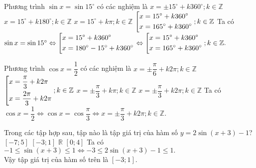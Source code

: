 \begin{ex}%
	Phương trình $\sin x =\sin 15^{\circ}$ có các nghiệm là
	\choice
	{$x=\pm 15^{\circ}+k360^{\circ}; k \in \mathbb{Z}$}
	{$x=15^{\circ}+k180^{\circ}; k \in \mathbb{Z}$}
	{$x=15^{\circ}+k\pi; k \in \mathbb{Z}$}
	{\True $\left[\begin{aligned}&x=15^{\circ}+k360^{\circ}\\&x=165^{\circ}+k360^{\circ}\\\end{aligned}\right.; k \in \mathbb{Z}$}
	\loigiai
	{Ta có $\sin x =\sin 15^{\circ}  \Leftrightarrow \left[\begin{aligned}&x=15^{\circ}+k360^{\circ}\\&x=180^{\circ} - 15^{\circ}+k360^{\circ}\\\end{aligned}\right.   \Leftrightarrow \left[\begin{aligned}&x=15^{\circ}+k360^{\circ}\\&x=165^{\circ}+k360^{\circ}\\\end{aligned}\right.; k \in \mathbb{Z}.$  
	}
\end{ex}
\begin{ex}%
	Phương trình $\cos x=\dfrac{1}{2}$ có các nghiệm là
	\choice
	{$x= \pm \dfrac{\pi}{6}+k2\pi; k \in \mathbb{Z}$}
	{$\left[\begin{aligned}&x=\dfrac{\pi}{3}+k2\pi\\&x=\dfrac{2\pi}{3}+k2\pi\\\end{aligned}\right.; k \in \mathbb{Z}$}
	{$x= \pm \dfrac{\pi}{3}+k\pi; k \in \mathbb{Z}$}
	{\True $x= \pm \dfrac{\pi}{3}+k2\pi; k \in \mathbb{Z}$}
	\loigiai
	{ 
		Ta có $\cos x=\dfrac{1}{2} \Leftrightarrow \cos x=\cos{\dfrac{\pi}{3}}  \Leftrightarrow  x= \pm \dfrac{\pi}{3}+k2\pi; k \in \mathbb{Z}.$	
	}
\end{ex}
\begin{ex}%
	Trong các tập hợp sau, tập nào là tập giá trị của hàm số \break $y=2\sin(x+3)-1$?
	\choice
	{$[-7;5]$}
	{\True $[-3;1]$}
	{$\mathbb{R}$}
	{$[0;4]$}
	\loigiai
	{ 
		Ta có $-1 \leq \sin(x+3)\leq 1 \Leftrightarrow -3 \leq 2\sin(x+3) -1 \leq 1.$\\
		Vậy tập giá trị của hàm số trên là $[-3;1]$.
	}
\end{ex}

